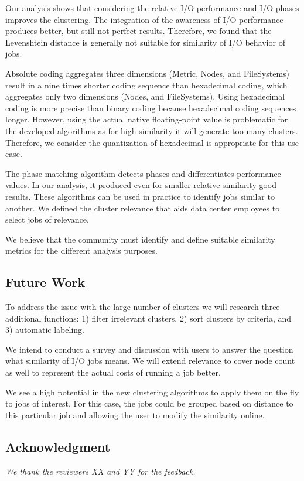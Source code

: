 \documentclass{jhps}
\begin{document}
{{{{Our analysis shows that considering the relative I/O performance and I/O phases improves the clustering.
The integration of the awareness of I/O performance produces better, but still not perfect results.
Therefore, we found that the Levenshtein distance is generally not suitable for similarity of I/O behavior of jobs.

Absolute coding aggregates three dimensions (Metric, Nodes, and FileSystems) result in a nine times shorter coding sequence than hexadecimal coding, which aggregates only two dimensions (Nodes, and FileSystems).
Using hexadecimal coding is more precise than binary coding because hexadecimal coding sequences longer.
However, using the actual native floating-point value is problematic for the developed algorithms as for high similarity it will generate too many clusters.
Therefore, we consider the quantization of hexadecimal is appropriate for this use case.

The phase matching algorithm detects phases and differentiates performance values.
In our analysis, it produced even for smaller relative similarity good results.
These algorithms can be used in practice to identify jobs similar to another.
We defined the cluster relevance that aids data center employees to select jobs of relevance.

We believe that the community must identify and define suitable similarity metrics for the different analysis purposes.


\subsection{Future Work}
To address the issue with the large number of clusters we will research three additional functions: 1) filter irrelevant clusters, 2) sort clusters by criteria, and 3) automatic labeling.

We intend to conduct a survey and discussion with users to answer the question what similarity of I/O jobs means.
We will extend relevance to cover node count as well to represent the actual costs of running a job better.

We see a high potential in the new clustering algorithms to apply them on the fly to jobs of interest.
For this case, the jobs could be grouped based on distance to this particular job and allowing the user to modify the similarity online.


\subsection*{Acknowledgment} %
\textit{We thank the reviewers XX and YY for the feedback.}

}}}}
\end{document}
